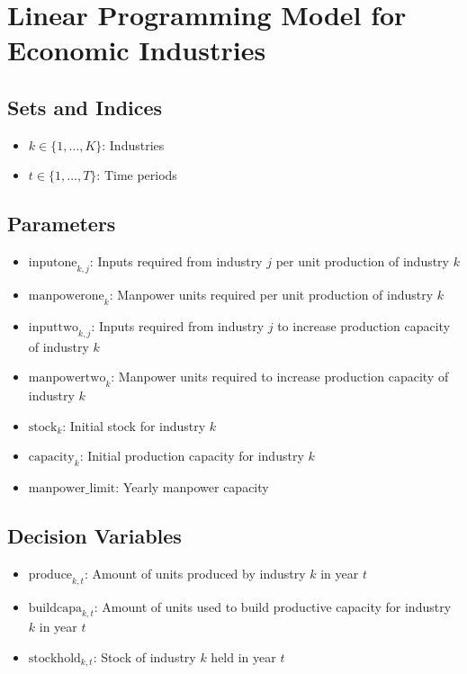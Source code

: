\documentclass{article}
\begin{document}
\section*{Linear Programming Model for Economic Industries}

\subsection*{Sets and Indices}
\begin{itemize}
    \item $k \in \{1, \ldots, K\}$: Industries
    \item $t \in \{1, \ldots, T\}$: Time periods
\end{itemize}

\subsection*{Parameters}
\begin{itemize}
    \item $\text{inputone}_{k,j}$: Inputs required from industry $j$ per unit production of industry $k$
    \item $\text{manpowerone}_{k}$: Manpower units required per unit production of industry $k$
    \item $\text{inputtwo}_{k,j}$: Inputs required from industry $j$ to increase production capacity of industry $k$
    \item $\text{manpowertwo}_{k}$: Manpower units required to increase production capacity of industry $k$
    \item $\text{stock}_{k}$: Initial stock for industry $k$
    \item $\text{capacity}_{k}$: Initial production capacity for industry $k$
    \item $\text{manpower\_limit}$: Yearly manpower capacity
\end{itemize}

\subsection*{Decision Variables}
\begin{itemize}
    \item $\text{produce}_{k,t}$: Amount of units produced by industry $k$ in year $t$
    \item $\text{buildcapa}_{k,t}$: Amount of units used to build productive capacity for industry $k$ in year $t$
    \item $\text{stockhold}_{k,t}$: Stock of industry $k$ held in year $t$
\end{itemize}
\end{document}
